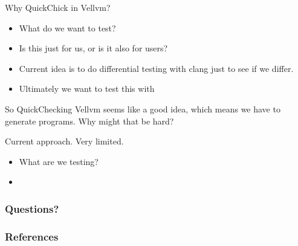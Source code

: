 \documentclass{beamer}
\begin{document}
\begin{frame}
  Why QuickChick in Vellvm?

  \begin{itemize}
  \item What do we want to test?
  \item Is this just for us, or is it also for users?
  \item Current idea is to do differential testing with clang just to
    see if we differ.
  \item Ultimately we want to test this with 
  \end{itemize}
\end{frame}

\begin{frame}
  So QuickChecking Vellvm seems like a good idea, which means we have
  to generate programs. Why might that be hard?
\end{frame}

\begin{frame}
  Current approach. Very limited.

  \begin{itemize}
  \item What are we testing?
  \item
  \end{itemize}
\end{frame}

\begin{frame}
  \frametitle{Questions?}

\end{frame}

\begin{frame}
  \frametitle{References}

  \nocite{*}
  \printbibliography
\end{frame}
\end{document}
